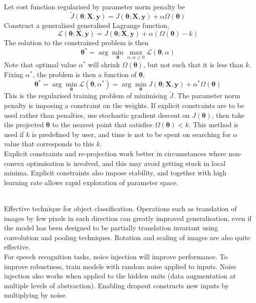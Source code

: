 \begin{remark} \\
Let cost function regularised by parameter norm penalty be
\begin{equation*}
\tilde{J}(\bm{\theta}; \bm{X}, \bm{y}) = J(\bm{\theta}; \bm{X}, \bm{y}) + \alpha \Omega(\bm{\theta}) \nonumber
\end{equation*}
Construct a generalised generalised Lagrange function,
\begin{equation*}
\mathcal{L}(\bm{\theta}; \bm{X}, \bm{y}) = J(\bm{\theta}; \bm{X}, \bm{y}) + \alpha (\Omega(\bm{\theta}) - k) \nonumber
\end{equation*}
The solution to the constrained problem is then
\begin{equation*}
\bm{\theta}^* = \arg \min_{\bm{\theta}} \max_{\alpha, \alpha \geq 0} \mathcal{L} (\bm{\theta}, \alpha) \nonumber
\end{equation*}
Note that optimal value $\alpha^*$ will shrink $\Omega(\bm{\theta})$, but not such that it is less than $k$.\\
Fixing $\alpha^*$, the problem is then a function of $\bm{\theta}$,
\begin{equation*}
\bm{\theta}^* = \arg \min_{\bm{\theta}} \mathcal{L} (\bm{\theta}, \alpha^*) = \arg \min_{\bm{\theta}} J(\bm{\theta}; \bm{X}, \bm{y}) + \alpha^* \Omega (\bm{\theta}) \nonumber
\end{equation*}
This is the regularised training problem of minimising $\tilde{J}$. The parameter norm penalty is imposing a constraint on the weights. If explicit constraints are to be used rather than penalties, use stochastic gradient descent on $J(\bm{\theta})$, then take the projected $\bm{\theta}$ to the nearest point that satisfies $\Omega(\bm{\theta}) < k$. This method is used if $k$ is predefined by user, and time is not to be spent on searching for $\alpha$ value that corresponds to this $k$.\\
Explicit constraints and re-projection work better in circumstances where non-convex optimisation is involved, and this may avoid getting stuck in local minima. Explicit constraints also impose stability, and together with high learning rate allows rapid exploration of parameter space.
\end{remark}

\begin{remark} \\
Effective technique for object classification. Operations such as translation of images by few pixels in each direction can greatly improved generalisation, even if the model has been designed to be partially translation invariant using convolution and pooling techniques. Rotation and scaling of images are also quite effective.\\
For speech recognition tasks, noice injection will improve performance. To improve robustness, train models with random noise applied to inputs. Noise injection also works when applied to the hidden units (data augmentation at multiple levels of abstraction). Enabling dropout constructs new inputs by multiplying by noise.
\end{remark}

